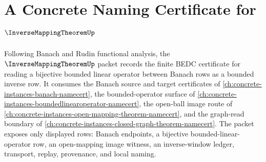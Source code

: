 \chapter{A Concrete Naming Certificate for $\InverseMappingTheoremUp$}
\label{ch:concrete-instances-inverse-mapping-theorem-namecert}

Following Banach and Rudin functional analysis, the $\InverseMappingTheoremUp$ packet records the finite BEDC certificate for reading a bijective bounded linear operator between Banach rows as a bounded inverse row. It consumes the Banach source and target certificates of \autoref{ch:concrete-instances-banach-namecert}, the bounded-operator surface of \autoref{ch:concrete-instances-boundedlinearoperator-namecert}, the open-ball image route of \autoref{ch:concrete-instances-open-mapping-theorem-namecert}, and the graph-read boundary of \autoref{ch:concrete-instances-closed-graph-theorem-namecert}. The packet exposes only displayed rows: Banach endpoints, a bijective bounded-linear-operator row, an open-mapping image witness, an inverse-window ledger, transport, replay, provenance, and local naming.

